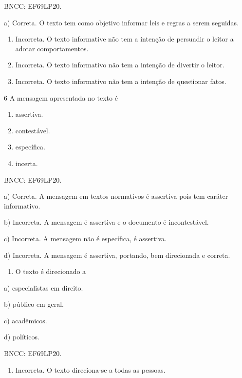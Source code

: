 BNCC: EF69LP20.

a) Correta. O texto tem como objetivo informar leis e regras a serem
seguidas.

\begin{enumerate}
\def\labelenumi{\alph{enumi})}
\setcounter{enumi}{1}
\item
  Incorreta. O texto informative não tem a intenção de persuadir o
  leitor a adotar comportamentos.
\item
  Incorreta. O texto informativo não tem a intenção de divertir o
  leitor.
\item
  Incorreta. O texto informativo não tem a intenção de questionar fatos.
\end{enumerate}

\num{6} A mensagem apresentada no texto é

\begin{enumerate}
\def\labelenumi{\alph{enumi})}
\item
  assertiva.
\item
  contestável.
\item
  específica.
\item
  incerta.
\end{enumerate}

BNCC: EF69LP20.

a) Correta. A mensagem em textos normativos é assertiva pois tem caráter
informativo.

b) Incorreta. A mensagem é assertiva e o documento é incontestável.

c) Incorreta. A mensagem não é específica, é assertiva.

d) Incorreta. A mensagem é assertiva, portando, bem direcionada e
correta.

\begin{enumerate}
\def\labelenumi{\arabic{enumi}.}
\setcounter{enumi}{6}
\tightlist
\item
  O texto é direcionado a
\end{enumerate}

a) especialistas em direito.

b) público em geral.

c) acadêmicos.

d) políticos.

BNCC: EF69LP20.

\begin{enumerate}
\def\labelenumi{\alph{enumi})}
\tightlist
\item
  Incorreta. O texto direciona-se a todas as pessoas.
\end{enumerate}

